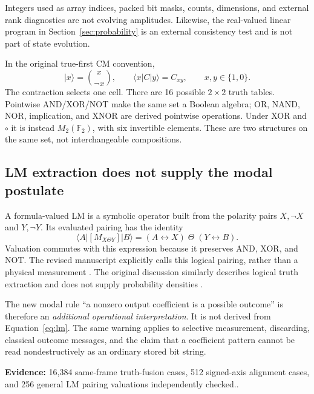 \documentclass[11pt,a4paper]{article}
\theoremstyle{definition}\newtheorem{definition}[theorem]{Definition}
\newcommand{\F}{\mathbb F_2}
\newcommand{\ket}[1]{\lvert #1\rangle}
\newcommand{\bra}[1]{\langle #1\rvert}
\newcommand{\ev}[1]{\textbf{Evidence:} #1.}
\begin{document}
Integers used as array indices, packed bit masks, counts, dimensions, and external rank diagnostics are not evolving amplitudes. Likewise, the real-valued linear program in Section~\ref{sec:probability} is an external consistency test and is not part of state evolution.

In the original true-first CM convention,
\[
 \ket{x}=\binom{x}{\neg x},\qquad
 \bra{x}C\ket{y}=C_{xy},\qquad x,y\in\{1,0\}.
\]
The contraction selects one cell. There are 16 possible $2\times2$ truth tables. Pointwise AND/XOR/NOT make the same set a Boolean algebra; OR, NAND, NOR, implication, and XNOR are derived pointwise operations. Under XOR and $\circ$ it is instead $M_2(\F)$, with six invertible elements. These are two structures on the same set, not interchangeable compositions.

\subsection{LM extraction does not supply the modal postulate}
A formula-valued LM is a symbolic operator built from the polarity pairs $X,\neg X$ and $Y,\neg Y$. Its evaluated pairing has the identity
\begin{equation}
 \bra{A}[M_{X\Theta Y}]\ket{B}
   =(A\leftrightarrow X)\;\Theta\;(Y\leftrightarrow B).
 \label{eq:lm}
\end{equation}
Valuation commutes with this expression because it preserves AND, XOR, and NOT. The revised manuscript explicitly calls this logical pairing, rather than a physical measurement \cite{theory2026}. The original discussion similarly describes logical truth extraction and does not supply probability densities \cite{droncheff2018}.

The new modal rule ``a nonzero output coefficient is a possible outcome'' is therefore an \emph{additional operational interpretation}. It is not derived from Equation~\eqref{eq:lm}. The same warning applies to selective measurement, discarding, classical outcome messages, and the claim that a coefficient pattern cannot be read nondestructively as an ordinary stored bit string.

\ev{16,384 same-frame truth-fusion cases, 512 signed-axis alignment cases, and 256 general LM pairing valuations independently checked.}
\end{document}
